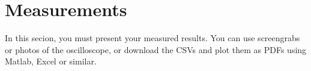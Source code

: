 \section{Measurements} \label{sec:measurement_voltage_peak_transducer}

In this secion, you must present your measured results. You can use screengrabs or photos of the oscilloscope, or download the CSVs and plot them as PDFs using Matlab, Excel or similar. 
